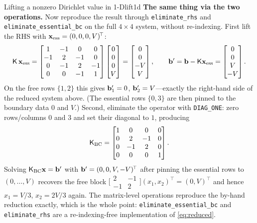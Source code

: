 \begin{workedexample}{Lifting a nonzero Dirichlet value in 1-D}{lift1d}
\medskip\noindent\textbf{The same thing via the two operations.}
Now reproduce the result through \texttt{eliminate\_rhs} and
\texttt{eliminate\_essential\_bc} on the full $4\times4$ system, without
re-indexing. First lift the RHS with $\mathbf{x}_{\mathrm{ess}}=(0,0,0,V)^{\!\top}$:
\[
  \mathsf{K}\,\mathbf{x}_{\mathrm{ess}} =
  \begin{bmatrix} 1&-1&0&0\\-1&2&-1&0\\0&-1&2&-1\\0&0&-1&1\end{bmatrix}
  \begin{bmatrix}0\\0\\0\\V\end{bmatrix}
  = \begin{bmatrix}0\\0\\-V\\V\end{bmatrix},
  \qquad
  \mathbf{b}' = \mathbf{b} - \mathsf{K}\mathbf{x}_{\mathrm{ess}} =
  \begin{bmatrix}0\\0\\V\\-V\end{bmatrix}.
\]
On the free rows $\{1,2\}$ this gives $\mathbf{b}'_1=0$, $\mathbf{b}'_2=V$---exactly the
right-hand side of the reduced system above. (The essential rows $\{0,3\}$ are
then pinned to the boundary data $0$ and $V$.) Second, eliminate the operator with
\texttt{DIAG\_ONE}: zero rows/columns $0$ and $3$ and set their diagonal to $1$,
producing
\[
  \mathsf{K}_{\mathrm{BC}} =
  \begin{bmatrix} 1&0&0&0\\ 0&2&-1&0\\ 0&-1&2&0\\ 0&0&0&1\end{bmatrix}.
\]
Solving $\mathsf{K}_{\mathrm{BC}}\mathbf{x}=\mathbf{b}'$ with $\mathbf{b}'=(0,0,V,-V)^{\!\top}$ after
pinning the essential rows to $(0,\dots,V)$ recovers the free block
$\bigl[\begin{smallmatrix}2&-1\\-1&2\end{smallmatrix}\bigr]
(x_1,x_2)^{\!\top}=(0,V)^{\!\top}$ and hence $x_1=V/3$, $x_2=2V/3$ again. The
matrix-level operations reproduce the by-hand reduction exactly, which is the
whole point: \texttt{eliminate\_essential\_bc} and \texttt{eliminate\_rhs} are a
re-indexing-free implementation of \cref{eq:reduced}.
\end{workedexample}

